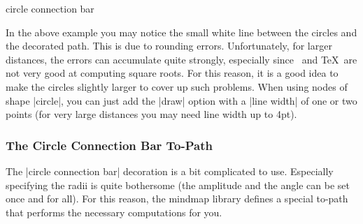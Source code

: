 \begin{decoration}{circle connection bar}
\begin{codeexample}[preamble={\usetikzlibrary{mindmap}}]
\end{codeexample}

    In the above example you may notice the small white line between the
    circles and the decorated path. This is due to rounding errors.
    Unfortunately, for larger distances, the errors can accumulate quite
    strongly, especially since \tikzname\ and \TeX\ are not very good at
    computing square roots. For this reason, it is a good idea to make the
    circles slightly larger to cover up such problems. When using nodes of
    shape |circle|, you can just add the |draw| option with a |line width| of
    one or two points (for very large distances you may need line width up to
    4pt).
\begin{codeexample}[preamble={\usetikzlibrary{mindmap}}]
\end{codeexample}

\end{decoration}


\subsubsection{The Circle Connection Bar To-Path}

The |circle connection bar| decoration is a bit complicated to use. Especially
specifying the radii is quite bothersome (the amplitude and the angle can be
set once and for all). For this reason, the mindmap library defines a special
to-path that performs the necessary computations for you.

